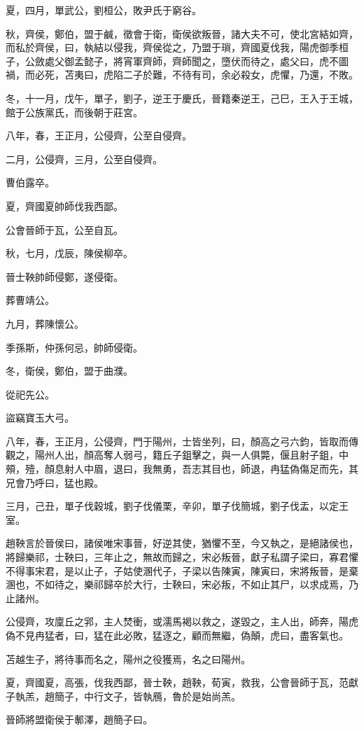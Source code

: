\begin{pinyinscope}
夏，四月，單武公，劉桓公，敗尹氏于窮谷。

秋，齊侯，鄭伯，盟于鹹，徵會于衛，衛侯欲叛晉，諸大夫不可，使北宮結如齊，而私於齊侯，曰，執結以侵我，齊侯從之，乃盟于瑣，齊國夏伐我，陽虎御季桓子，公斂處父御孟懿子，將宵軍齊師，齊師聞之，墮伏而待之，處父曰，虎不圖禍，而必死，苫夷曰，虎陷二子於難，不待有司，余必殺女，虎懼，乃還，不敗。

冬，十一月，戊午，單子，劉子，逆王于慶氏，晉籍秦逆王，己巳，王入于王城，館于公族黨氏，而後朝于莊宮。

八年，春，王正月，公侵齊，公至自侵齊。

二月，公侵齊，三月，公至自侵齊。

曹伯露卒。

夏，齊國夏帥師伐我西鄙。

公會晉師于瓦，公至自瓦。

秋，七月，戊辰，陳侯柳卒。

晉士鞅帥師侵鄭，遂侵衛。

葬曹靖公。

九月，葬陳懷公。

季孫斯，仲孫何忌，帥師侵衛。

冬，衛侯，鄭伯，盟于曲濮。

從祀先公。

盜竊寶玉大弓。

八年，春，王正月，公侵齊，門于陽州，士皆坐列，曰，顏高之弓六鈞，皆取而傳觀之，陽州人出，顏高奪人弱弓，籍丘子鉏擊之，與一人俱斃，偃且射子鉏，中頰，殪，顏息射人中眉，退曰，我無勇，吾志其目也，師退，冉猛偽傷足而先，其兄會乃呼曰，猛也殿。

三月，己丑，單子伐穀城，劉子伐儀栗，辛卯，單子伐簡城，劉子伐盂，以定王室。

趙鞅言於晉侯曰，諸侯唯宋事晉，好逆其使，猶懼不至，今又執之，是絕諸侯也，將歸樂祁，士鞅曰，三年止之，無故而歸之，宋必叛晉，獻子私謂子梁曰，寡君懼不得事宋君，是以止子，子姑使溷代子，子梁以告陳寅，陳寅曰，宋將叛晉，是棄溷也，不如待之，樂祁歸卒於大行，士鞅曰，宋必叛，不如止其尸，以求成焉，乃止諸州。

公侵齊，攻廩丘之郛，主人焚衝，或濡馬褐以救之，遂毀之，主人出，師奔，陽虎偽不見冉猛者，曰，猛在此必敗，猛逐之，顧而無繼，偽顛，虎曰，盡客氣也。

苫越生子，將待事而名之，陽州之役獲焉，名之曰陽州。

夏，齊國夏，高張，伐我西鄙，晉士鞅，趙鞅，荀寅，救我，公會晉師于瓦，范獻子執羔，趙簡子，中行文子，皆執鴈，魯於是始尚羔。

晉師將盟衛侯于鄟澤，趙簡子曰。


\end{pinyinscope}
